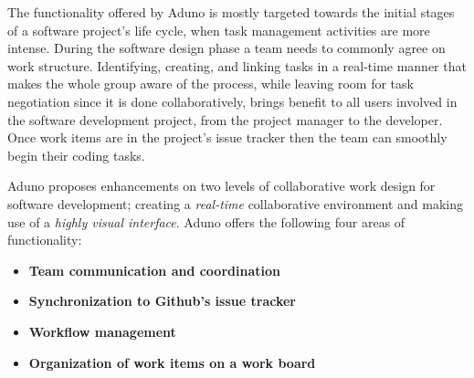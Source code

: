 \documentclass[conference]{IEEEtran}
\begin{document}
The functionality offered by Aduno is mostly targeted towards the initial stages of a software project's life cycle, when task management activities are more intense. During the software design phase a team needs to commonly agree on work structure. Identifying, creating, and linking tasks in a real-time manner that makes the whole group aware of the process, while leaving room for task negotiation since it is done collaboratively, brings benefit to all users involved in the software development project, from the project manager to the developer. Once work items are in the project's issue tracker then the team can smoothly begin their coding tasks.

Aduno proposes enhancements on two levels of collaborative work design for software development; creating a \textit{real-time} collaborative environment and making use of a \textit{highly visual interface}. Aduno offers the following four areas of functionality:

\begin{itemize}
	\item \textbf{Team communication and coordination}
	\item \textbf{Synchronization to Github's issue tracker}
	\item \textbf{Workflow management}
	\item \textbf{Organization of work items on a work board}
\end{itemize}
\end{document}
